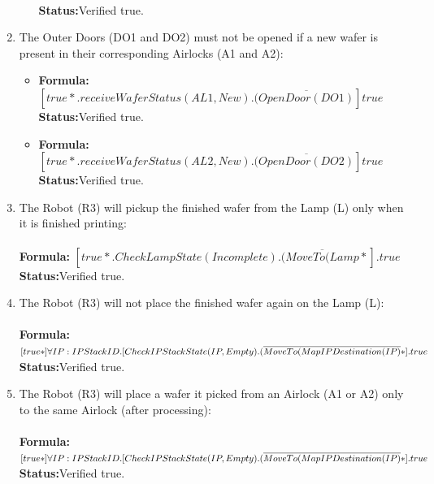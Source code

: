 \documentclass[a4paper,12pt]{article}
\begin{document}
\begin{enumerate}
\begin{itemize}
    \\\textbf{Status:}Verified true.
	\end{itemize}
\item The Outer Doors (DO1 and DO2) must not be opened if a new wafer is present in their corresponding Airlocks (A1 and A2):
\begin{itemize}
	\item \textbf{Formula:} $[true*.receiveWaferStatus(AL1,New).(\overline{OpenDoor(DO1)}]true$ 
	\\\textbf{Status:}Verified true.
    \item \textbf{Formula:} $[true*.receiveWaferStatus(AL2,New).(\overline{OpenDoor(DO2)}]true$  
    \\\textbf{Status:}Verified true.
	\end{itemize}
\item The Robot (R3) will pickup the finished wafer from the Lamp (L) only when it is finished printing:
\\
\\\textbf{Formula:} $[true*.CheckLampState(Incomplete).(\overline{MoveTo(Lamp}*].true$ \\\textbf{Status:}Verified true.
\item The Robot (R3) will not place the finished wafer again on the Lamp (L):
\\
\\\textbf{Formula:} $[true*] \forall IP: IPStackID.[CheckIPStackState(IP, Empty).
\\(\overline{MoveTo(MapIPDestination(IP)}*].true$ \\\textbf{Status:}Verified true.


\item The Robot (R3) will place a wafer it picked from an Airlock (A1 or A2) only to the same Airlock (after processing):
\\
\\\textbf{Formula:} $[true*] \forall IP: IPStackID.[CheckIPStackState(IP, Empty).
\\(\overline{MoveTo(MapIPDestination(IP)}*].true$ \\\textbf{Status:}Verified true.
\end{enumerate}
\newpage
\end{document}
